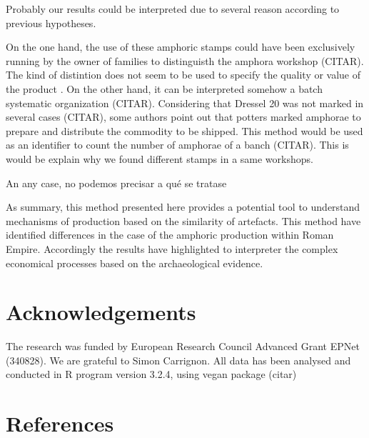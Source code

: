 \documentclass[review]{elsarticle}
\begin{document}




 Probably our results could be interpreted due to several reason according to previous hypotheses. 


On the one hand, the use of these amphoric stamps could have been exclusively running by the owner of families to distinguisth the amphora workshop (CITAR). The kind of distintion does not seem to be used to specify the quality or value of the product \citep{callender}. 
On the other hand, it can be interpreted somehow a batch systematic organization (CITAR). Considering that Dressel 20 was not marked in several cases (CITAR), some authors point out that potters marked amphorae to prepare and distribute the commodity to be shipped. This method would be used as an identifier to count the number of amphorae of a banch (CITAR). This is would be explain why we found different stamps in a same workshops. 



An any case, no podemos precisar a qué se tratase

As summary, this method presented here provides a potential tool to understand mechanisms of production based on the similarity of artefacts. This method have identified differences in the case of the amphoric production within Roman Empire. Accordingly the results have highlighted to interpreter the complex economical processes based on  the archaeological evidence. 



\section{Acknowledgements}

The research was funded by European Research Council Advanced Grant EPNet (340828). We are grateful to Simon Carrignon. 
All data has been analysed and conducted in R program version 3.2.4, using vegan package (citar) 


\section{References}


\end{document}
